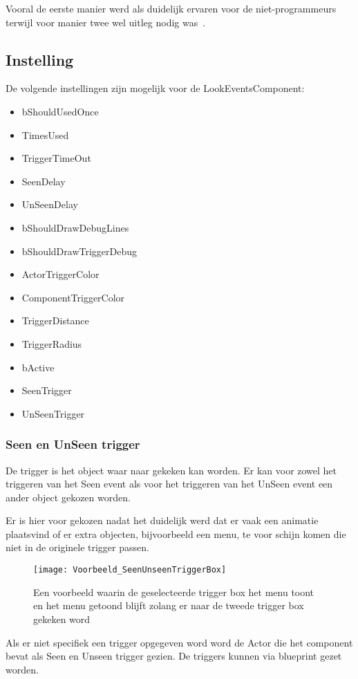 Vooral de eerste manier werd als duidelijk ervaren voor de niet-programmeurs terwijl voor manier twee wel uitleg nodig was~.

\subsection{Instelling}
De volgende instellingen zijn mogelijk voor de LookEventsComponent:

\begin{itemize}
	\item bShouldUsedOnce
	\item TimesUsed
	\item TriggerTimeOut
	\item SeenDelay
	\item UnSeenDelay
	\item bShouldDrawDebugLines
	\item bShouldDrawTriggerDebug
	\item ActorTriggerColor
	\item ComponentTriggerColor
	\item TriggerDistance
	\item TriggerRadius
	\item bActive
	\item SeenTrigger
	\item UnSeenTrigger
\end{itemize}

\subsubsection{Seen en UnSeen trigger}
De trigger is het object waar naar gekeken kan worden. Er kan voor zowel het triggeren van het Seen event als voor het triggeren van het UnSeen event een ander object gekozen worden.

Er is hier voor gekozen nadat het duidelijk werd dat er vaak een animatie plaatsvind of er extra objecten, bijvoorbeeld een menu, te voor schijn komen die niet in de originele trigger passen.

\begin{figure}[!ht]
  \centering
    \texttt{[image: Voorbeeld\_SeenUnseenTriggerBox]}
    \caption{Een voorbeeld waarin de geselecteerde trigger box het menu toont en het menu getoond blijft zolang er naar de tweede trigger box gekeken word}
\end{figure}

Als er niet specifiek een trigger opgegeven word word de Actor die het component bevat als Seen en Unseen trigger gezien. De triggers kunnen via blueprint gezet worden.

